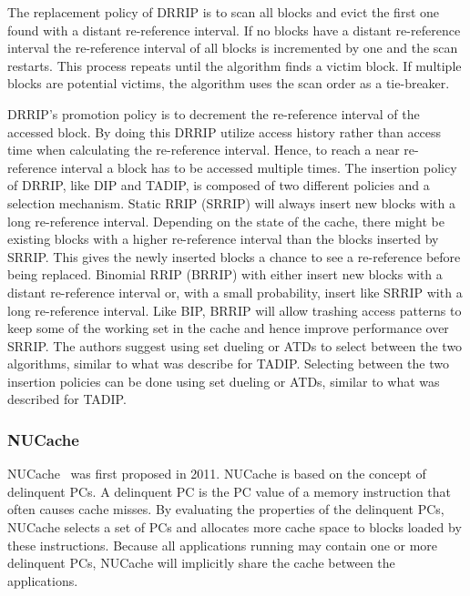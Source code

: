 The replacement policy of DRRIP is to scan all blocks and evict the first one found with a distant re-reference interval.
If no blocks have a distant re-reference interval the re-reference interval of all blocks is incremented by one and the scan restarts.
This process repeats until the algorithm finds a victim block.
If multiple blocks are potential victims, the algorithm uses the scan order as a tie-breaker.

DRRIP's promotion policy is to decrement the re-reference interval of the accessed block.
By doing this DRRIP utilize access history rather than access time when calculating the re-reference interval.
Hence, to reach a near re-reference interval a block has to be accessed multiple times.
The insertion policy of DRRIP, like DIP and TADIP, is composed of two different policies and a selection mechanism.
Static RRIP (SRRIP) will always insert new blocks with a long re-reference interval. 
Depending on the state of the cache, there might be existing blocks with a higher re-reference interval than the blocks inserted by SRRIP.
This gives the newly inserted blocks a chance to see a re-reference before being replaced.
Binomial RRIP (BRRIP) with either insert new blocks with a distant re-reference interval or, with a small probability, insert like SRRIP with a long re-reference interval.
Like BIP, BRRIP will allow trashing access patterns to keep some of the working set in the cache and hence improve performance over SRRIP.
The authors suggest using set dueling or ATDs to select between the two algorithms, similar to what was describe for TADIP.
Selecting between the two insertion policies can be done using set dueling or ATDs, similar to what was described for TADIP.

\subsubsection{NUCache}

NUCache~\cite{Manikantan2011} was first proposed in 2011.
NUCache is based on the concept of delinquent PCs.
A delinquent PC is the PC value of a memory instruction that often causes cache misses.
By evaluating the properties of the delinquent PCs, NUCache selects a set of PCs and allocates more cache space to blocks loaded by these instructions.
Because all applications running may contain one or more delinquent PCs, NUCache will implicitly share the cache between the applications.


